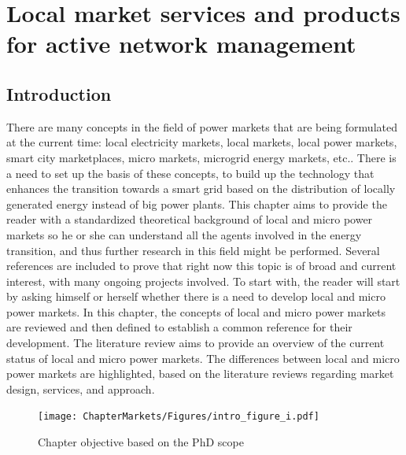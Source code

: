 \renewcommand\labelenumi{(\roman{enumi})}
\renewcommand\theenumi\labelenumi

\chapter{Local market services and products for active network management}
\label{chapterMarkets}

\section{Introduction}
There are many concepts in the field of power markets that are being formulated at the current time: local electricity markets, local markets, local power markets, smart city marketplaces, micro markets, microgrid energy markets, etc.. There is a need to set up the basis of these concepts, to build up the technology that enhances the transition towards a smart grid based on the distribution of locally generated energy instead of big power plants.
This chapter aims to provide the reader with a standardized theoretical background of local and micro power markets so he or she can understand all the agents involved in the energy transition, and thus further research in this field might be performed. Several references are included to prove that right now this topic is of broad and current interest, with many ongoing projects involved.
To start with, the reader will start by asking himself or herself whether there is a need to develop local and micro power markets.
In this chapter, the concepts of local and micro power markets are reviewed and then defined to establish a common reference for their development. The literature review aims to provide an overview of the current status of local and micro power markets. The differences between local and micro power markets are highlighted, based on the literature reviews regarding market design, services, and approach.

\begin{figure}[]
	\centering
	\texttt{[image: ChapterMarkets/Figures/intro\_figure\_i.pdf]}
		\caption{Chapter objective based on the PhD scope}
	\label{fig:chapter_obj}  
\end{figure}

